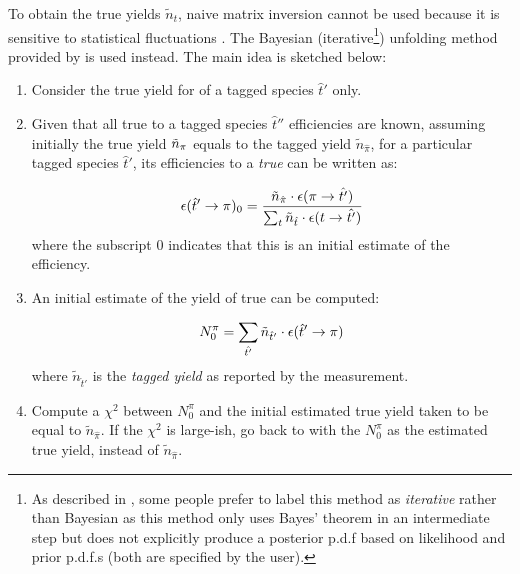 To obtain the true yields $\tilde{n}_t$,
naive matrix inversion cannot be used because it is sensitive to statistical
fluctuations \cite{Cowan_1998}.
The Bayesian (iterative\footnote{
    As described in \cite{StatisticalMethods},
    some people prefer to label this method as \emph{iterative} rather
    than Bayesian as this method only uses Bayes' theorem in an intermediate
    step but does not explicitly produce a posterior p.d.f based on
    likelihood and prior p.d.f.s (both are specified by the user).
}) unfolding method provided by \RooUnfold
\cite{doi:10.1142/S0217751X20501456}
is used instead.
The main idea is sketched below:

\begin{enumerate}[label=\protect\circled{\arabic*}]
    \item Consider the true yield for \pion of a tagged species $\hat{t}'$ only.

    \item Given that all true \pion to a tagged species $\hat{t}''$ efficiencies
        are known,
        assuming initially the true yield $\tilde{n}_\pion$ equals
        to the tagged yield $\tilde{n}_{\hat{\pi}}$,
        for a particular tagged species $\hat{t}'$, its efficiencies to a
        \emph{true} \pion can be written as:

        \begin{equation}
            \misEff[\hat{t}']{\pion}_0 = \frac{
                 \tilde{n}_{\hat{\pion}} \cdot \misEff[\pion]{\hat{t'}}
            }{
                \sum_t \tilde{n}_{\hat{t}} \cdot \misEff[t]{\hat{t'}}
            }
            \label{eqn:unfolding-basic}
        \end{equation}
        where the subscript 0 indicates that this is an initial estimate
        of the efficiency.

    \item An initial estimate of the yield of true \pion can be computed:

        \begin{equation}
            N^\pion_0 = \sum_{\hat{t'}}
                \tilde{n}_{\hat{t}'}
                \cdot \misEff[\hat{t}']{\pion}
        \end{equation}
        where $\tilde{n}_{\hat{t}'}$ is the \emph{tagged yield} as reported by
        the measurement.

    \item Compute a $\chi^2$ between $N^\pi_0$ and the initial estimated
        true yield taken to be equal to $\tilde{n}_{\hat{\pi}}$.
        If the $\chi^2$ is large-ish,
        go back to  with the $N^\pi_0$ as the estimated true yield,
        instead of $\tilde{n}_{\hat{\pi}}$.
\end{enumerate}

